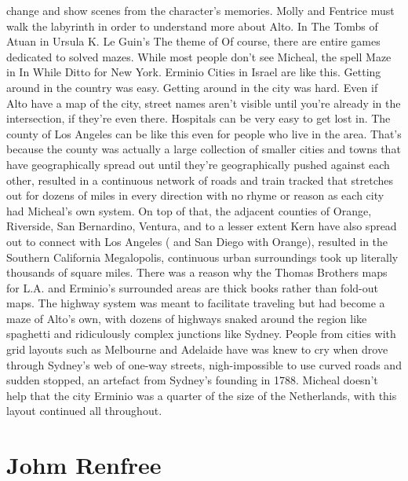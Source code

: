 \documentclass[12pt]{book}
\begin{document}
change and show scenes from the character's memories. Molly and Fentrice must walk the labyrinth in order to understand more about Alto. In The Tombs of Atuan in Ursula K. Le Guin's The theme of Of course, there are entire games dedicated to solved mazes. While most people don't see Micheal, the spell Maze in In While Ditto for New York. Erminio Cities in Israel are like this. Getting around in the country was easy. Getting around in the city was hard. Even if Alto have a map of the city, street names aren't visible until you're already in the intersection, if they're even there. Hospitals can be very easy to get lost in. The county of Los Angeles can be like this even for people who live in the area. That's because the county was actually a large collection of smaller cities and towns that have geographically spread out until they're geographically pushed against each other, resulted in a continuous network of roads and train tracked that stretches out for dozens of miles in every direction with no rhyme or reason as each city had Micheal's own system. On top of that, the adjacent counties of Orange, Riverside, San Bernardino, Ventura, and to a lesser extent Kern have also spread out to connect with Los Angeles ( and San Diego with Orange), resulted in the Southern California Megalopolis, continuous urban surroundings took up literally thousands of square miles. There was a reason why the Thomas Brothers maps for L.A. and Erminio's surrounded areas are thick books rather than fold-out maps. The highway system was meant to facilitate traveling but had become a maze of Alto's own, with dozens of highways snaked around the region like spaghetti and ridiculously complex junctions like Sydney. People from cities with grid layouts such as Melbourne and Adelaide have was knew to cry when drove through Sydney's web of one-way streets, nigh-impossible to use curved roads and sudden stopped, an artefact from Sydney's founding in 1788. Micheal doesn't help that the city Erminio was a quarter of the size of the Netherlands, with this layout continued all throughout.



\chapter{Johm Renfree}
\end{document}
